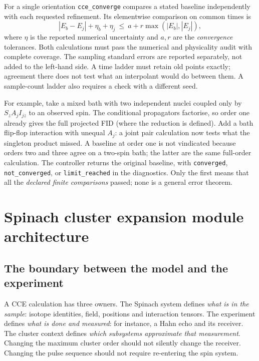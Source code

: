 \documentclass[11pt,a4paper]{article}
\newcommand{\code}[1]{\texttt{#1}}
\begin{document}
For a single orientation \code{cce\_converge} compares a stated
baseline independently with each requested refinement. Its elementwise
comparison on common times is
\begin{equation}
 |E_b-E_j|+\eta_b+\eta_j\ \le\ a+r\max(|E_b|,|E_j|),
 \label{eq:cce-numerics-budget}
\end{equation}
where $\eta$ is the reported numerical uncertainty and $a,r$ are the
\emph{convergence} tolerances. Both calculations must pass the numerical
and physicality audit with complete coverage. The sampling standard
errors are reported separately, not added to the left-hand side. A time
ladder must retain old points exactly; agreement there does not test
what an interpolant would do between them. A sample-count ladder also
requires a check with a different seed.

For example, take a mixed bath with two independent nuclei coupled only
by $S_z A_j I_{jz}$ to an observed spin. The conditional propagators
factorise, so order one already gives the full projected FID (where the
reduction is defined). Add a bath flip-flop interaction with unequal
$A_j$: a joint pair calculation now tests what the singleton product
missed. A baseline at order one is not vindicated because orders two
and three agree on a two-spin bath; the latter are the same full-order
calculation. The controller returns the original baseline, with
\code{converged}, \code{not\_converged}, or \code{limit\_reached} in
the diagnostics. Only the first means that all the \emph{declared finite
comparisons} passed; none is a general error theorem.

\section{Spinach cluster expansion module architecture}\label{sec:architecture}
\subsection{The boundary between the model and the experiment}
A CCE calculation has three owners. The Spinach system defines \emph{what is in the sample}: isotope identities, field, positions and interaction tensors. The experiment defines \emph{what is done and measured}: for instance, a Hahn echo and its receiver. The cluster context defines \emph{which subsystems approximate that measurement}. Changing the maximum cluster order should not silently change the receiver. Changing the pulse sequence should not require re-entering the spin system.
\end{document}
